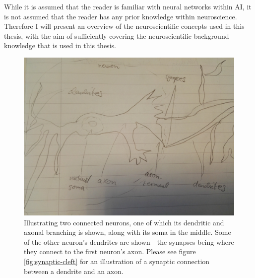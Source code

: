 While it is assumed that the reader is familiar with neural networks within AI, it is not assumed that the reader has any prior knowledge within neuroscience. Therefore I will present an overview of the neuroscientific concepts used in this thesis, with the aim of sufficiently covering the neuroscientific background knowledge that is used in this thesis.
\\

\begin{figure}
    \centering
    \includegraphics[width=12cm]{fig/neurons-synapses.jpg}
    \caption{Illustrating two connected neurons, one of which its dendritic and axonal branching is shown, along with its soma in the middle. Some of the other neuron's dendrites are shown - the synapses being where they connect to the first neuron's axon. Please see figure \ref{fig:synaptic-cleft} for an illustration of a synaptic connection between a dendrite and an axon.}
    \label{fig:neurons-synapses}
\end{figure}

